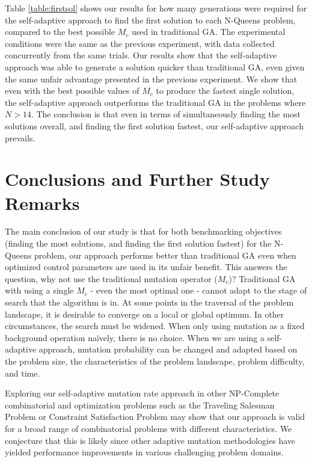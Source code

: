 \documentclass[conference]{IEEEtran}
\begin{document}
Table \ref{table:firstsol} shows our results for how many generations were required for the self-adaptive approach to find the first solution to each N-Queens problem, compared to the best possible $M_{c}$ used in traditional GA. The experimental conditions were the same as the previous experiment, with data collected concurrently from the same trials. Our results show that the self-adaptive approach was able to generate a solution quicker than traditional GA, even given the same unfair advantage presented in the previous experiment. We show that even with the best possible values of $M_{c}$ to produce the fastest single solution, the self-adaptive approach outperforms the traditional GA in the problems where $N > 14$. The conclusion is that even in terms of simultaneously finding the most solutions overall, and finding the first solution fastest, our self-adaptive approach prevails.

\section{Conclusions and Further Study Remarks}
The main conclusion of our study is that for both benchmarking objectives (finding the most solutions, and finding the first solution fastest) for the N-Queens problem, our approach performs better than traditional GA even when optimized control parameters are used in its unfair benefit. This answers the question, why not use the traditional mutation operator ($M_{c}$)? Traditional GA with using a single $M_{c}$ - even the most optimal one - cannot adapt to the stage of search that the algorithm is in. At some points in the traversal of the problem landscape, it is desirable to converge on a local or global optimum. In other circumstances, the search must be widened. When only using mutation as a fixed background operation na\"{i}vely, there is no choice. When we are using a self-adaptive approach, mutation probability can be changed and adapted based on the problem size, the characteristics of the problem landscape, problem difficulty, and time.

Exploring our self-adaptive mutation rate approach in other NP-Complete combinatorial and optimization problems such as the Traveling Salesman Problem or Constraint Satisfaction Problem may show that our approach is valid for a broad range of combinatorial problems with different characteristics. We conjecture that this is likely since other adaptive mutation methodologies have yielded performance improvements in various challenging problem domains.
\end{document}
